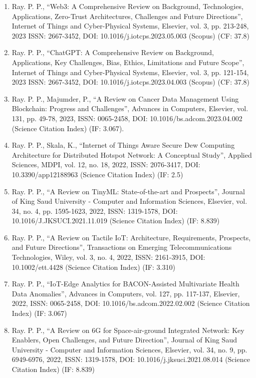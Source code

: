 \documentclass[11pt,a4paper]{moderncv}
\begin{document}
\begin{adjustwidth}{6em}{0pt}
\begin{enumerate}
		\item Ray. P. P., “Web3: A Comprehensive Review on Background, Technologies, Applications, Zero-Trust Architectures, Challenges and Future Directions”, Internet of Things and Cyber-Physical Systems, Elsevier, vol. 3, pp. 213-248, 2023 ISSN: 2667-3452, DOI: 10.1016/j.iotcps.2023.05.003 (Scopus) (CF: 37.8)
		
		\item Ray. P. P., “ChatGPT: A Comprehensive Review on Background, Applications, Key Challenges, Bias, Ethics, Limitations and Future Scope”, Internet of Things and Cyber-Physical Systems, Elsevier, vol. 3, pp. 121-154, 2023 ISSN: 2667-3452, DOI: 10.1016/j.iotcps.2023.04.003 (Scopus) (CF: 37.8)
		
		\item Ray. P. P., Majumder, P., “A Review on Cancer Data Management Using Blockchain: Progress and Challenges”, Advances in Computers, Elsevier, vol. 131, pp. 49-78, 2023, ISSN: 0065-2458, DOI: 10.1016/bs.adcom.2023.04.002 (Science Citation Index) (IF: 3.067).
		
		\item Ray. P. P., Skala, K., “Internet of Things Aware Secure Dew Computing Architecture for Distributed Hotspot Network: A Conceptual Study”, Applied Sciences, MDPI, vol. 12, no. 18, 2022, ISSN: 2076-3417, DOI: 10.3390/app12188963 (Science Citation Index) (IF: 2.5)  
		
		\item Ray. P. P., “A Review on TinyML: State-of-the-art and Prospects”, Journal of King Saud University - Computer and Information Sciences, Elsevier, vol. 34, no. 4, pp. 1595-1623, 2022, ISSN: 1319-1578, DOI: 10.1016/J.JKSUCI.2021.11.019 (Science Citation Index) (IF: 8.839)
		
		\item Ray. P. P., “A Review on Tactile IoT: Architecture, Requirements, Prospects, and Future Directions”, Transactions on Emerging Telecommunications Technologies, Wiley, vol. 3, no. 4, 2022, ISSN: 2161-3915, DOI: 10.1002/ett.4428 (Science Citation Index) (IF: 3.310) 
		
		\item Ray. P. P., “IoT-Edge Analytics for BACON-Assisted Multivariate Health Data Anomalies”, Advances in Computers, vol. 127, pp. 117-137, Elsevier, 2022, ISSN: 0065-2458, DOI: 10.1016/bs.adcom.2022.02.002 (Science Citation Index) (IF: 3.067)
		
		\item Ray. P. P., “A Review on 6G for Space-air-ground Integrated Network: Key Enablers, Open Challenges, and Future Direction”, Journal of King Saud University - Computer and Information Sciences, Elsevier, vol. 34, no. 9, pp. 6949-6976, 2022, ISSN: 1319-1578, DOI: 10.1016/j.jksuci.2021.08.014 (Science Citation Index) (IF: 8.839) 
		

\end{enumerate}
\end{adjustwidth}
\end{document}
